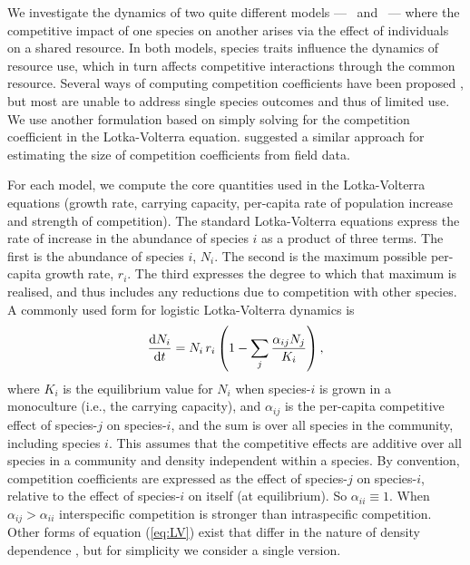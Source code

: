\documentclass[a4paper,11pt]{article}
\begin{document}
We investigate the dynamics of two quite different models --- \Rstar\
and \plant\ --- where the competitive impact of one species on another arises via the effect of individuals on a shared resource.
%
In both models, species traits influence the dynamics of resource use,
which in turn affects competitive interactions through the common resource.
Several ways of computing competition coefficients have been proposed \citep[e.g.,][]{Abrams-1987,Abrams-2008}, but most are unable to address single species outcomes and thus of limited use.
%
We use another formulation based on simply solving for the competition coefficient in the Lotka-Volterra equation. \citet{Ricklefs-1973}
suggested a similar approach for estimating the size of competition coefficients from field data.

For each model, we compute the core quantities used in the
Lotka-Volterra equations (growth rate, carrying capacity, per-capita rate of population increase and strength of competition).
The standard Lotka-Volterra equations express the rate of increase in the abundance of species $i$ as a product of three terms.
%
The first is the abundance of species $i$, $N_i$.
%
The second is the maximum possible per-capita growth rate, $r_i$. The third expresses the degree to which that maximum is realised, and thus includes any reductions due to competition with other species. A
commonly used form for logistic Lotka-Volterra dynamics is
%
\begin{equation}
\label{eq:LV}
\frac{\mathrm{d} N_i}{\mathrm{d} t} =
N_i\, r_i \left(1 - \sum_j \frac{\alpha_{ij} N_j}{K_i}\right),
\end{equation}
%
where $K_i$ is the equilibrium value for $N_i$ when species-$i$ is grown in a monoculture (i.e., the carrying capacity), and
$\alpha_{ij}$ is the per-capita competitive effect of species-$j$ on species-$i$, and the sum is over all species in the community,
including species $i$.
This assumes that the competitive effects are additive over all species in a community and density independent within a species.
%
By convention, competition coefficients are expressed as the effect of species-$j$ on species-$i$, relative to the effect of species-$i$ on itself (at equilibrium).  So $\alpha_{ii} \equiv 1$. When
$\alpha_{ij} > \alpha_{ii}$ interspecific competition is stronger than intraspecific competition.
%
Other forms of equation (\ref{eq:LV}) exist that differ in the nature of density dependence \citep[e.g.][]{Leimar-2013}, but for simplicity we consider a single version.
\end{document}
